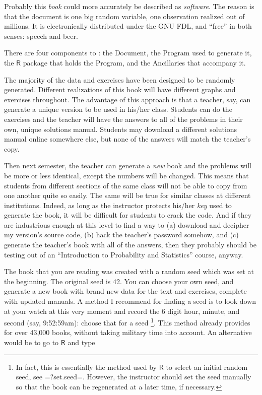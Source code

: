 \documentclass[captions=tableheading]{scrbook}
\begin{document}
\begin{example}



Probably this \emph{book} could more accurately be described as \emph{software}. The reason is that the document is one big random variable, one observation realized out of millions. It is electronically distributed under the GNU FDL, and ``free'' in both senses: speech and beer.  

There are four components to \IPSUR: the Document, the Program used to generate it, the \(\mathsf{R}\) package that holds the Program, and the Ancillaries that accompany it.

The majority of the data and exercises have been designed to be randomly generated. Different realizations of this book will have different graphs and exercises throughout. The advantage of this approach is that a teacher, say, can generate a unique version to be used in his/her class. Students can do the exercises and the teacher will have the answers to all of the problems in their own, unique solutions manual. Students may download a different solutions manual online somewhere else, but none of the answers will match the teacher's copy. 

Then next semester, the teacher can generate a \emph{new} book and the problems will be more or less identical, except the numbers will be changed. This means that students from different sections of the same class will not be able to copy from one another quite so easily. The same will be true for similar classes at different institutions. Indeed, as long as the instructor protects his/her \emph{key} used to generate the book, it will be difficult for students to crack the code. And if they are industrious enough at this level to find a way to (a) download and decipher my version's source code, (b) hack the teacher's password somehow, and (c) generate the teacher's book with all of the answers, then they probably should be testing out of an ``Introduction to Probability and Statistics'' course, anyway. 

The book that you are reading was created with a random seed which was set at the beginning. The original seed is 42. You can choose your own seed, and generate a new book with brand new data for the text and exercises, complete with updated manuals. A method I recommend for finding a seed is to look down at your watch at this very moment and record the 6 digit hour, minute, and second (say, 9:52:59am): choose that for a seed
\footnote{In fact, this is essentially the method used by \(\mathsf{R}\) to select an initial random seed, see =?set.seed=. However, the instructor should set the seed manually so that the book can be regenerated at a later time, if necessary.}.
This method already provides for over 43,000 books, without taking military time into account. An alternative would be to go to \(\mathsf{R}\) and type 




\end{example}
\end{document}
